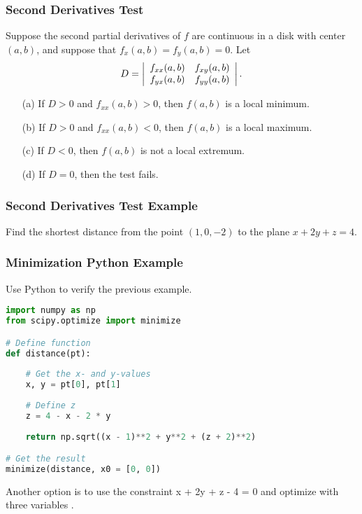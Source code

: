 \documentclass{beamer}
\begin{document}
\begin{frame}
\frametitle{Second Derivatives Test}
Suppose the second partial derivatives of $f$ are continuous in a disk with center $(a, b)$, and suppose that $f_x(a, b) = f_y(a, b) = 0$. Let
$$
D = \left|\begin{array}{c c} f_{xx}(a, b)	&	f_{xy}(a, b)\\ f_{yx}(a, b)	&	f_{yy}(a, b)\end{array}\right|.
$$
\begin{enumerate}
\item[(a)] If $D >0$ and $f_{xx} (a, b) > 0$, then $f(a,b)$ is a local minimum.
\item[(b)] If $D > 0$ and $f_{xx}(a, b) < 0$, then $f(a, b)$ is a local maximum.
\item[(c)] If $D < 0$, then $f(a, b)$ is not a local extremum.
\item[(d)] If $D = 0$, then the test fails.
\end{enumerate}

\end{frame}


\begin{frame}[t]
\frametitle{Second Derivatives Test Example}
\begin{Example}
Find the shortest distance from the point $(1, 0, -2)$ to the plane $x + 2y + z = 4$.
\end{Example}
\end{frame}

\begin{frame}[fragile]
\frametitle{Minimization Python Example}
\small

\begin{Example}
Use Python to verify the previous example.
\end{Example}

\begin{lstlisting}[language=Python]
import numpy as np
from scipy.optimize import minimize

# Define function
def distance(pt):
    
    # Get the x- and y-values
    x, y = pt[0], pt[1]
    
    # Define z 
    z = 4 - x - 2 * y
    
    return np.sqrt((x - 1)**2 + y**2 + (z + 2)**2)

# Get the result   
minimize(distance, x0 = [0, 0]) 
\end{lstlisting}
Another option is to use the constraint x + 2y + z - 4 = 0 and optimize with three variables .
\end{frame}
\end{document}
